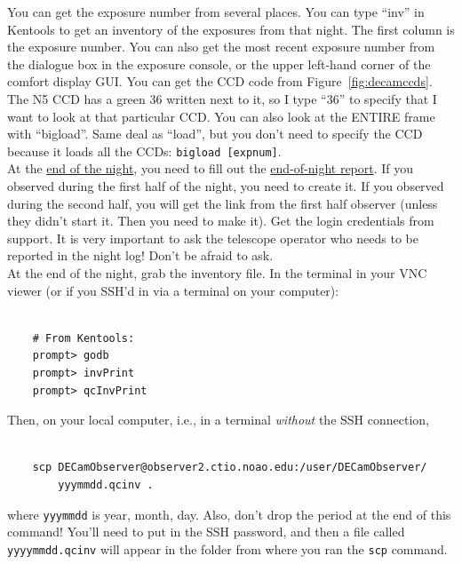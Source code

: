 You can get the exposure number from several places. You can type ``inv'' in Kentools to get an inventory of the exposures from that night. The first column is the exposure number. You can also get the most recent exposure number from the dialogue box in the exposure console, or the upper left-hand corner of the comfort display GUI. You can get the CCD code from Figure~\ref{fig:decamccds}. The N5 CCD has a green 36 written next to it, so I type ``36'' to specify that I want to look at that particular CCD. You can also look at the ENTIRE frame with ``bigload''. Same deal as ``load'', but you don't need to specify the CCD because it loads all the CCDs: \texttt{bigload [expnum]}. \\

At the \href{http://www.ctio.noao.edu/noao/content/End-Night-2}{end of the night}, you need to fill out the \href{http://www.ctio.noao.edu/noao/node/add/night-report}{end-of-night report}. If you observed during the first half of the night, you need to create it. If you observed during the second half, you will get the link from the first half observer (unless they didn't start it. Then you need to make it). Get the login credentials from support. It is very important to ask the telescope operator who needs to be reported in the night log! Don't be afraid to ask.\\

At the end of the night, grab the inventory file. In the terminal in your VNC viewer (or if you SSH'd in via a terminal on your computer):

\begin{verbatim}

    # From Kentools:
    prompt> godb
    prompt> invPrint
    prompt> qcInvPrint
\end{verbatim}

Then, on your local computer, i.e., in a terminal \textit{without} the SSH connection, 
\begin{verbatim}

    scp DECamObserver@observer2.ctio.noao.edu:/user/DECamObserver/
        yyymmdd.qcinv .
\end{verbatim}

where \texttt{yyymmdd} is year, month, day. Also, don't drop the period at the end of this command! You'll need to put in the SSH password, and then a file called \texttt{yyyymmdd.qcinv} will appear in the folder from where you ran the \texttt{scp} command.